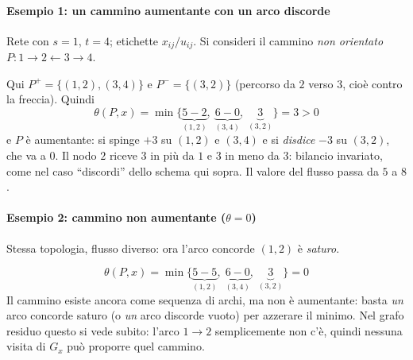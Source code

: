\documentclass[12pt]{extarticle} %
\begin{document}
\paragraph{Esempio 1: un cammino aumentante con un arco discorde}
Rete con $s=1$, $t=4$; etichette $x_{ij}/u_{ij}$. Si consideri il cammino \emph{non orientato} $P: 1 \to 2 \leftarrow 3 \to 4$.
\begin{center}
\end{center}
Qui $P^+ = \{(1,2),(3,4)\}$ e $P^- = \{(3,2)\}$ (percorso da $2$ verso $3$, cioè contro la freccia). Quindi
\[
\theta(P,x) = \min\{\underbrace{5-2}_{(1,2)},\; \underbrace{6-0}_{(3,4)},\; \underbrace{3}_{(3,2)}\} = 3 > 0
\]
e $P$ è aumentante: si spinge $+3$ su $(1,2)$ e $(3,4)$ e si \emph{disdice} $-3$ su $(3,2)$, che va a $0$. Il nodo $2$ riceve $3$ in più da $1$ e $3$ in meno da $3$: bilancio invariato, come nel caso ``discordi'' dello schema qui sopra. Il valore del flusso passa da $5$ a $8$.

\paragraph{Esempio 2: cammino non aumentante ($\theta = 0$)}
Stessa topologia, flusso diverso: ora l'arco concorde $(1,2)$ è \emph{saturo}.
\begin{center}
\end{center}
\[
\theta(P,x) = \min\{\underbrace{5-5}_{(1,2)},\; \underbrace{6-0}_{(3,4)},\; \underbrace{3}_{(3,2)}\} = 0
\]
Il cammino esiste ancora come sequenza di archi, ma non è aumentante: basta \emph{un} arco concorde saturo (o \emph{un} arco discorde vuoto) per azzerare il minimo. Nel grafo residuo questo si vede subito: l'arco $1 \to 2$ semplicemente non c'è, quindi nessuna visita di $G_x$ può proporre quel cammino.
\end{document}
